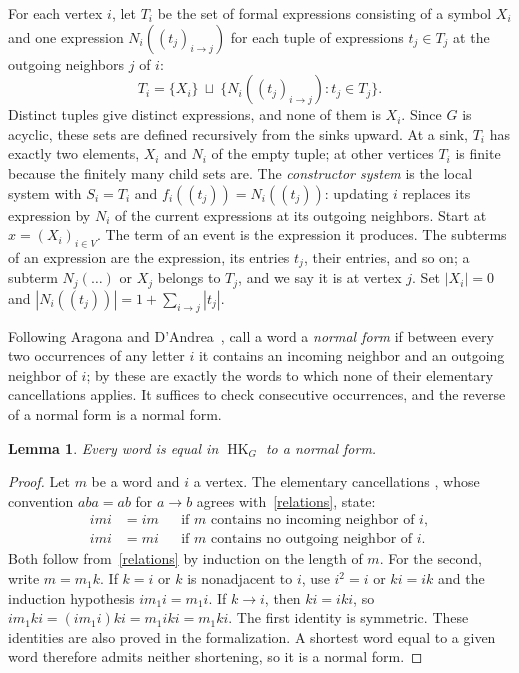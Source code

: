 \documentclass[11pt]{article}
\newtheorem{lemma}[theorem]{Lemma}
\newcommand{\HK}{\operatorname{HK}}
\begin{document}
For each vertex $i$, let $T_i$ be the set of formal expressions consisting
of a symbol $X_i$ and one expression $N_i((t_j)_{i\to j})$ for each tuple of
expressions $t_j\in T_j$ at the outgoing neighbors $j$ of $i$:
\[
 T_i=\{X_i\}\ \sqcup\ \{N_i((t_j)_{i\to j}):t_j\in T_j\}.
\]
Distinct tuples give distinct expressions, and none of them is $X_i$. Since
$G$ is acyclic, these sets are defined recursively from the sinks upward.
At a sink, $T_i$ has exactly two elements, $X_i$ and $N_i$ of the empty
tuple; at other vertices $T_i$ is finite because the finitely many child
sets are. The \emph{constructor system} is the local system with $S_i=T_i$
and $f_i((t_j))=N_i((t_j))$: updating $i$ replaces its expression by $N_i$
of the current expressions at its outgoing neighbors. Start at
$x=(X_i)_{i\in V}$. The term of an event is the expression it produces. The
subterms of an expression are the expression, its entries $t_j$, their
entries, and so on; a subterm $N_j(\dots)$ or $X_j$ belongs to $T_j$, and
we say it is at vertex $j$. Set $|X_i|=0$ and
$|N_i((t_j))|=1+\sum_{i\to j}|t_j|$.

Following Aragona and D'Andrea~\cite{AD}, call a word a \emph{normal form}
if between every two occurrences of any letter $i$ it contains an incoming
neighbor and an outgoing neighbor of $i$; by \cite[Remark 2.5]{AD} these are
exactly the words to which none of their elementary cancellations applies.
It suffices to check consecutive occurrences, and the reverse of a normal
form is a normal form.

\begin{lemma}\label{reduction}
Every word is equal in $\HK_G$ to a normal form.
\end{lemma}
\begin{proof}
Let $m$ be a word and $i$ a vertex. The elementary cancellations
\cite[Lemma 2.1]{AD}, whose convention $aba=ab$ for $a\to b$ agrees
with~\eqref{relations}, state:
\begin{align*}
 imi&=im &&\text{if $m$ contains no incoming neighbor of $i$},\\
 imi&=mi &&\text{if $m$ contains no outgoing neighbor of $i$}.
\end{align*}
Both follow from~\eqref{relations} by induction on the length of $m$. For
the second, write $m=m_1k$. If $k=i$ or $k$ is nonadjacent to $i$, use
$i^2=i$ or $ki=ik$ and the induction hypothesis $im_1i=m_1i$. If $k\to i$,
then $ki=iki$, so $im_1ki=(im_1i)ki=m_1iki=m_1ki$. The first identity is
symmetric. These identities are also proved in the formalization. A
shortest word equal to a given word therefore admits neither shortening,
so it is a normal form.
\end{proof}
\end{document}
